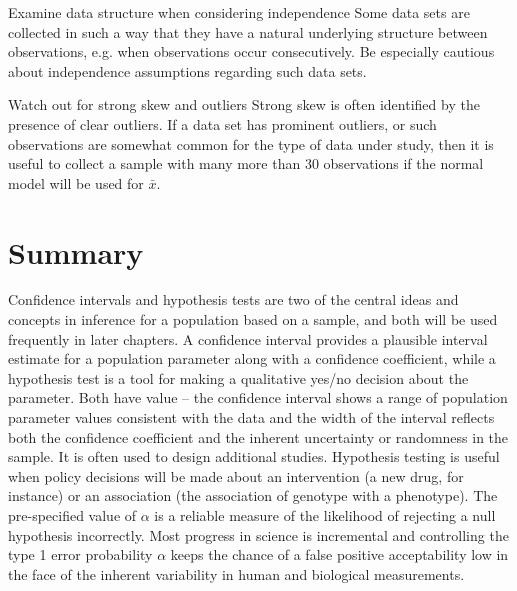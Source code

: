 \begin{spacing}{1.5}
\begin{caution}
{Examine data structure when considering independence}
{Some data sets are collected in such a way that they have a natural underlying structure between observations, e.g. when observations occur consecutively. Be especially cautious about independence assumptions regarding such data sets.}
\end{caution}

\begin{caution}{Watch out for strong skew and outliers}
{Strong skew is often identified by the presence of clear outliers. If a data set has prominent outliers, or such observations are somewhat common for the type of data under study, then it is useful to collect a sample with many more than 30 observations if the normal model will be used for $\bar{x}$.}
\end{caution}


\section[Summary]{Summary}
\label{ch4Summary}

Confidence intervals and hypothesis tests are two of the central ideas and concepts in inference for a population based on a sample, and both will be used frequently in later chapters.  A confidence interval provides a plausible interval estimate for a population parameter along with a confidence coefficient, while a hypothesis test is a tool for making a qualitative yes/no decision about the parameter. Both have value -- the confidence interval shows a range of population parameter values consistent with the data and the width of the interval reflects both the confidence coefficient and the inherent uncertainty or randomness in the sample. It is often used to design additional studies.  Hypothesis testing is useful when policy decisions will be made about an intervention (a new drug, for instance) or an association (the association of genotype with a phenotype).  The pre-specified value of $\alpha$ is a reliable measure of the likelihood of rejecting a null hypothesis incorrectly.  Most progress in science is incremental and controlling the type 1 error probability $\alpha$ keeps the chance of a false positive acceptability low in the face of the inherent variability in human and biological measurements.


\end{spacing}
